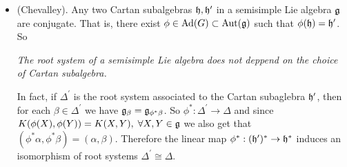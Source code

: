 \begin{itemize}
    \item (Chevalley). Any two Cartan subalgebras $\mathfrak{h},\mathfrak{h}^\prime$ 
    in a semisimple Lie algebra $\mathfrak{g}$ are conjugate. That is, there exist 
    $\phi\in \text{Ad}(G)\subset \text{Aut}(\mathfrak{g})$ such that $\phi(\mathfrak{h})=\mathfrak{h}^\prime$. So 
    \begin{center}
        \textit{The root system of a semisimple Lie algebra does not deppend on the choice of Cartan subalgebra.}
    \end{center}
    In fact, if $\Delta^\prime$ is the root system associated to the Cartan subaglebra $\mathfrak{h}^\prime$, then for each 
    $\beta\in\Delta^\prime$ we have $\mathfrak{g}_\beta=\mathfrak{g}_{\phi^*\beta}$. So $\phi^*:\Delta^\prime\to\Delta$ and since 
    $K(\phi(X),\phi(Y))=K(X,Y),\;\forall X,Y\in\mathfrak{g}$ we also get that $(\phi^*\alpha,\phi^*\beta)=(\alpha,\beta)$. Therefore 
    the linear map $\phi^*:(\mathfrak{h}^\prime)^*\to\mathfrak{h}^*$ induces an isomorphism of root systems $\Delta^\prime\cong\Delta$.


\end{itemize}
